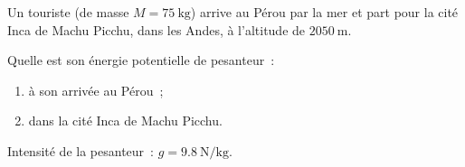 Un touriste (de masse $M=\qty{75}{\kg}$) arrive au Pérou par la mer et part pour
la cité Inca de Machu Picchu, dans les Andes, à l'altitude de $\qty{2050}{\m}$.

Quelle est son énergie potentielle de pesanteur~:
\begin{enumerate}
    \item à son arrivée au Pérou~;
    \item dans la cité Inca de Machu Picchu.
\end{enumerate}

\begin{donnees}
    Intensité de la pesanteur~: $g=\qty{9.8}{\N\per\kg}$.
\end{donnees}


